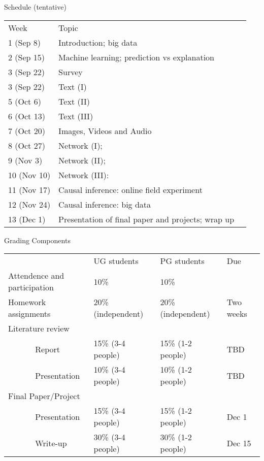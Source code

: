 \documentclass[handout]{beamer}
\begin{document}
\begin{frame}[label={h:23cf13ad-9dd8-4585-8d2c-a27667854b7e}]{Schedule (tentative)}
\begin{center}
\begin{tabular}{|l|l|l|}
Week & Topic\\
1 (Sep 8) & Introduction; big data\\
2 (Sep 15) & Machine learning; prediction vs explanation\\
3 (Sep 22) & Survey\\
3 (Sep 22) & Text (I)\\
5 (Oct 6) & Text (II)\\
6 (Oct 13) & Text (III)\\
7 (Oct 20) & Images, Videos and Audio\\
8 (Oct 27) & Network (I);\\
9 (Nov 3) & Network (II);\\
10 (Nov 10) & Network (III):\\
11 (Nov 17) & Causal inference: online field experiment\\
12 (Nov 24) & Causal inference: big data\\
13 (Dec 1) & Presentation of final paper and projects; wrap up\\
\end{tabular}
\end{center}
\end{frame}
\begin{frame}[label={h:c4270a41-b6e4-402a-99b1-4928313ab8d3}]{Grading Components}
\begin{center}
\begin{tabular}{|l|l|l|l|}
 & UG students & PG students & Due\\
Attendence and participation & 10\% & 10\% & \\
Homework assignments & 20\% (independent) & 20\% (independent) & Two weeks\\
Literature review &  &  & \\
~ ~ ~ ~ Report & 15\% (3-4 people) & 15\%  (1-2 people) & TBD\\
~ ~ ~ ~ Presentation & 10\% (3-4 people) & 10\% (1-2 people) & TBD\\
Final Paper/Project &  &  & \\
~ ~ ~ ~ Presentation & 15\% (3-4 people) & 15\% (1-2 people) & Dec 1\\
~ ~ ~ ~ Write-up & 30\% (3-4 people) & 30\% (1-2 people) & Dec 15\\
\end{tabular}
\end{center}
\end{frame}
\end{document}
